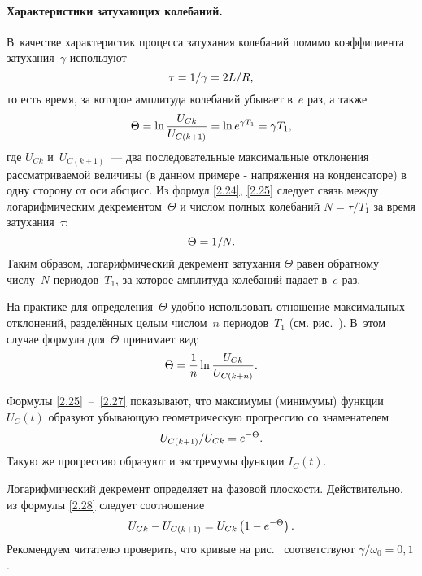\documentclass[a4paper,oneside]{book}
\begin{document}
\paragraph{Характеристики затухающих колебаний.}
В~качестве характеристик процесса затухания колебаний помимо коэффициента
затухания~$\gamma$ используют 
\begin{equation}\eqmark{2.24}
	\tau=1/\gamma=2L/R,
\end{equation}
то есть время, за которое амплитуда колебаний убывает в~$e$ раз, а также
\begin{equation}\eqmark{2.25}
	\Theta=\ln\dfrac{U_{Ck}}{U_{C(k+1)}}=\ln e^{\gamma T_1}=\gamma T_1,
\end{equation}
где $U_{Ck}$ и~$U_{C(k+1)}$~--- два последовательные максимальные отклонения
рассматриваемой величины (в данном примере - напряжения на конденсаторе) в одну
сторону от оси абсцисс. Из формул \eqref{2.24}, \eqref{2.25} следует связь между
логарифмическим декрементом~$\Theta$ и числом полных колебаний $N=\tau/T_1$ за
время затухания~$\tau$:
\begin{equation}\eqmark{2.26}
\Theta=1/N.
\end{equation}
Таким образом, логарифмический декремент затухания $\Theta$ равен обратному
числу~$N$ периодов~$T_1$, за которое амплитуда колебаний падает в~$e$ раз.

На практике для определения~$\Theta$ удобно использовать отношение максимальных
отклонений, разделённых целым числом~$n$ периодов~$T_1$ (см.
рис.~). В~этом случае формула для~$\Theta$ принимает вид:
\begin{equation}\eqmark{2.27}
\Theta=\dfrac{1}{n}\ln\dfrac{U_{Ck}}{U_{C(k+n)}}.
\end{equation}

Формулы \eqref{2.25}~--~\eqref{2.27} показывают, что максимумы (минимумы)
функции $U_C(t)$ образуют убывающую геометрическую прогрессию со знаменателем
\begin{equation}\eqmark{2.28}
U_{C(k+1)}/U_{Ck}=e^{-\Theta}.
\end{equation}
Такую же прогрессию образуют и экстремумы функции $I_C(t)$.

Логарифмический декремент определяет  на фазовой плоскости. Действительно, из формулы \eqref{2.28} следует соотношение
\begin{equation}\eqmark{2.29}
	U_{Ck}-U_{C(k+1)}=U_{Ck}\left(1-e^{-\Theta}\right).
\end{equation}
Рекомендуем читателю проверить, что кривые на рис.~ соответствуют
$\gamma/\omega_0=0,1$.
\end{document}
